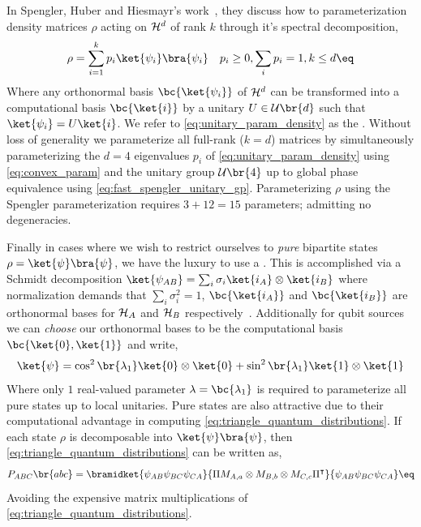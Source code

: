 \documentclass[aps, 10pt, english, twoside, pra, nofootinbib, longbibliography]{revtex4-1}
\begin{document}
    In Spengler, Huber and Hiesmayr's work~\cite{Spengler_2010_Unitary}, they discuss how to parameterization density matrices $\rho$ acting on $\mathcal{H}^d$ of rank $k$ through it's spectral decomposition,
    \[ \rho = \sum_{i=1}^{k} p_i \ket{\psi_i}\bra{\psi_i} \quad p_i \geq 0, \sum_{i} p_i = 1, k \leq d \eq \label{eq:unitary_param_density} \]
    Where any orthonormal basis $\bc{\ket{\psi_i}}$ of $\mathcal{H}^d$ can be transformed into a computational basis $\bc{\ket{i}}$ by a unitary $U \in \mathcal{U}\br{d}$ such that $\ket{\psi_i} = U\ket{i}$. We refer to \cref{eq:unitary_param_density} as the . Without loss of generality we parameterize all full-rank ($k=d$) matrices by simultaneously parameterizing the $d=4$ eigenvalues $p_i$ of \cref{eq:unitary_param_density} using \cref{eq:convex_param} and the unitary group $\mathcal{U}\br{4}$ up to global phase equivalence using \cref{eq:fast_spengler_unitary_gp}. Parameterizing $\rho$ using the Spengler parameterization requires $3 + 12 = 15$ parameters; admitting no degeneracies.

    Finally in cases where we wish to restrict ourselves to \textit{pure} bipartite states $\rho = \ket{\psi}\bra{\psi}$, we have the luxury to use a . This is accomplished via a Schmidt decomposition $\ket{\psi_{AB}} = \sum_{i}\sigma_i \ket{i_A}\otimes\ket{i_B}$ where normalization demands that $\sum_{i} \sigma_i^2 = 1$, $\bc{\ket{i_A}}$ and $\bc{\ket{i_B}}$ are orthonormal bases for $\mathcal{H}_A$ and $\mathcal{H}_B$ respectively~\cite{Neilsen_Chaung_2011}. Additionally for qubit sources we can \textit{choose} our orthonormal bases to be the computational basis $\bc{\ket{0}, \ket{1}}$ and write,
    \[ \ket{\psi} = \cos^2\br{\lambda_1} \ket{0} \otimes \ket{0} + \sin^2\br{\lambda_1} \ket{1} \otimes \ket{1} \]
    Where only $1$ real-valued parameter $\lambda = \bc{\lambda_1}$ is required to parameterize all pure states up to local unitaries. Pure states are also attractive due to their computational advantage in computing \cref{eq:triangle_quantum_distributions}. If each state $\rho$ is decomposable into $\ket{\psi}\bra{\psi}$, then \cref{eq:triangle_quantum_distributions} can be written as,
    \[ \prob[ABC]\br{abc} = \bramidket{\psi_{AB}\psi_{BC}\psi_{CA}}{\netperm M_{A,a}\otimes M_{B,b} \otimes M_{C,c} \netperm^\intercal}{\psi_{AB}\psi_{BC}\psi_{CA}} \eq \label{eq:pure_state_quantum_triangle} \]
    Avoiding the expensive matrix multiplications of \cref{eq:triangle_quantum_distributions}.
\end{document}
